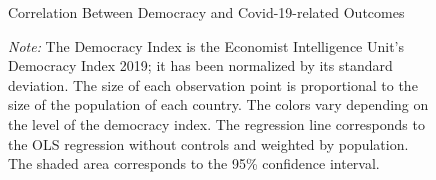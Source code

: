 
\begin{figure}[H]
\centering
\caption{Correlation Between Democracy and Covid-19-related Outcomes}\label{fig:ols}
\centering
  \caption*{\textit{Note:} The Democracy Index is the Economist Intelligence Unit's Democracy Index 2019; it has been normalized by its standard deviation. The size of each observation point is proportional to the size of the population of each country. The colors vary depending on the level of the democracy index. The regression line corresponds to the OLS regression without controls and weighted by population. The shaded area corresponds to the 95\% confidence interval.}
\end{figure}


